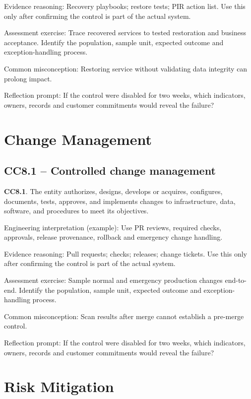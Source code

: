\documentclass[10pt,oneside]{report}
\begin{document}
Evidence reasoning: Recovery playbooks; restore tests; PIR action list. Use this only after confirming the control is part of the actual system.

Assessment exercise: Trace recovered services to tested restoration and business acceptance. Identify the population, sample unit, expected outcome and exception-handling process.

Common misconception: Restoring service without validating data integrity can prolong impact.

Reflection prompt: If the control were disabled for two weeks, which indicators, owners, records and customer commitments would reveal the failure?

\section{Change Management}
\subsection{CC8.1 -- Controlled change management}
\begin{aicpabox}
\textbf{CC8.1}. The entity authorizes, designs, develops or acquires, configures, documents, tests, approves, and implements changes to infrastructure, data, software, and procedures to meet its objectives.\par{}
\end{aicpabox}
Engineering interpretation (example): Use PR reviews, required checks, approvals, release provenance, rollback and emergency change handling.

Evidence reasoning: Pull requests; checks; releases; change tickets. Use this only after confirming the control is part of the actual system.

Assessment exercise: Sample normal and emergency production changes end-to-end. Identify the population, sample unit, expected outcome and exception-handling process.

Common misconception: Scan results after merge cannot establish a pre-merge control.

Reflection prompt: If the control were disabled for two weeks, which indicators, owners, records and customer commitments would reveal the failure?

\section{Risk Mitigation}
\end{document}
